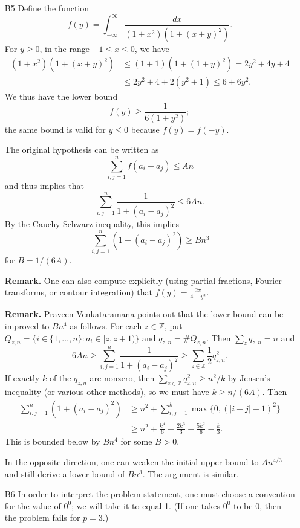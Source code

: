 \documentclass[amssymb,twocolumn,pra,10pt,aps]{revtex4-1}
\newcommand{\ZZ}{\mathbb{Z}}
\begin{document}
\begin{itemize}
\item[B5]
Define the function
\[
f(y) =
\int_{-\infty}^\infty \frac{dx}{(1+x^2)(1+(x+y)^2)}.
\]
For $y \geq 0$, in the range $-1 \leq x \leq 0$,
we have
\begin{align*}
(1+x^2)(1+(x+y)^2) &\leq (1+1)(1+(1+y)^2) = 2y^2+4y+4 \\
&\leq 2y^2+4+2(y^2+1) \leq 6+6y^2.
\end{align*}
We thus have the lower bound
\[
f(y) \geq \frac{1}{6(1+y^2)};
\]
the same bound is valid for $y \leq 0$ because $f(y) = f(-y)$.

The original hypothesis can be written as
\[
\sum_{i,j=1}^n f(a_i - a_j) \leq An
\]
and thus
implies that
\[
\sum_{i,j=1}^n \frac{1}{1 + (a_i-a_j)^2} \leq 6An.
\]
By the Cauchy-Schwarz inequality, this implies
\[
\sum_{i,j=1}^n (1 + (a_i-a_j)^2) \geq Bn^3
\]
for $B = 1/(6A)$.

\textbf{Remark.}
One can also compute explicitly (using partial fractions, Fourier transforms, or contour integration)
that $f(y) = \frac{2\pi}{4 + y^2}$.

\textbf{Remark.}
Praveen Venkataramana points out that the lower bound can be improved to $Bn^4$
as follows. For each $z \in \ZZ$, put $Q_{z,n} = \{i\in \{1,\dots,n\}: a_i \in [z, z+1)\}$ and $q_{z,n} = \#Q_{z,n}$. Then
$\sum_z q_{z,n} = n$ and
\[
6An \geq \sum_{i,j=1}^n \frac{1}{1 + (a_i-a_j)^2} \geq \sum_{z \in \ZZ} \frac{1}{2} q_{z,n}^2.
\]
If exactly $k$ of the $q_{z,n}$ are nonzero, then $\sum_{z \in \ZZ} q_{z,n}^2 \geq n^2/k$ by Jensen's inequality
(or various other methods), so we must have $k \geq n/(6A)$. Then
\begin{align*}
\sum_{i,j=1}^n (1 + (a_i-a_j)^2) &\geq
n^2 + \sum_{i,j=1}^k \max\{0, (|i-j|-1)^2\} \\
&\geq
n^2 + \frac{k^4}{6}-\frac{2k^3}{3}+\frac{5k^2}{6}-\frac{k}{3}.
\end{align*}
This is bounded below by $Bn^4$ for some $B>0$.

In the opposite direction, one can weaken the initial upper bound to $An^{4/3}$ and still
derive a lower bound of $Bn^3$. The argument is similar.

\item[B6]
In order to interpret the problem statement, one must choose a convention for the value of $0^0$; we will take
it to equal 1. (If one takes $0^0$ to be 0, then the problem fails for $p=3$.)


\end{itemize}
\end{document}
